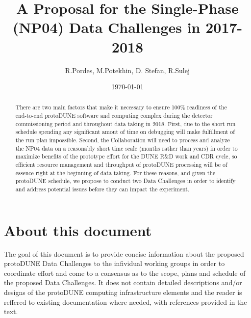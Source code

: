\documentclass[pdftex,12pt,letter]{article}
\title{A Proposal for the Single-Phase \pd (NP04) Data Challenges in 2017-2018}
\date{\today}
\author{R.Pordes, M.Potekhin, D. Stefan, R.Sulej}
\newcommand{\pd}{protoDUNE\xspace}
\begin{document}

\maketitle

\begin{abstract}
\noindent There are two main factors that make it necessary to ensure 100\% readiness of the
end-to-end \pd software and computing complex during the detector commissioning period and
throughout data taking in 2018. First, due to the short run schedule spending any significant amout
of time on debugging will make fulfillment of
the run plan impossible. Second, the Collaboration will need to process and analyze the NP04 data
on a reasonably short time scale (months rather than years) in order to maximize benefits of the
prototype effort for the DUNE R\&D work and CDR cycle, so efficient resource management and
throughput of \pd processing will be of essence right at the beginning of data taking. For these
reasons, and given the \pd schedule,  we propose to conduct two Data Challenges in order to identify
and address potential issues before they can impact the experiment.



\end{abstract}

\tableofcontents

\pagebreak

\section{About this document}
The goal of this document is to provide concise information about the proposed \pd Data Challenges
to the infividual working groups in order to coordinate effort and come to a consensus as to the scope,
plans and schedule of the proposed Data Challenges. It does not contain detailed descriptions
and/or designs of the \pd computing
infrastructure elements and the reader is reffered to existing documentation where
needed, with references provided in the text.
\end{document}
